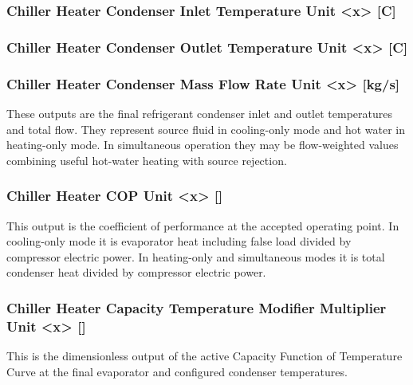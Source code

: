 \subsubsection{Chiller Heater Condenser Inlet Temperature Unit \textless{}x\textgreater{} {[}C{]}}\label{chiller-heater-condenser-inlet-temperature-unit-x-c}

\subsubsection{Chiller Heater Condenser Outlet Temperature Unit \textless{}x\textgreater{} {[}C{]}}\label{chiller-heater-condenser-outlet-temperature-unit-x-c}

\subsubsection{Chiller Heater Condenser Mass Flow Rate Unit \textless{}x\textgreater{} {[}kg/s{]}}\label{chiller-heater-condenser-mass-flow-rate-unit-x-kgs}

These outputs are the final refrigerant condenser inlet and outlet temperatures and total flow. They represent source fluid in cooling-only mode and hot water in heating-only mode. In simultaneous operation they may be flow-weighted values combining useful hot-water heating with source rejection.

\subsubsection{Chiller Heater COP Unit \textless{}x\textgreater{} {[]}}\label{chiller-heater-cop-unit-x}

This output is the coefficient of performance at the accepted operating point. In cooling-only mode it is evaporator heat including false load divided by compressor electric power. In heating-only and simultaneous modes it is total condenser heat divided by compressor electric power.

\subsubsection{Chiller Heater Capacity Temperature Modifier Multiplier Unit \textless{}x\textgreater{} {[]}}\label{chiller-heater-capacity-temperature-modifier-multiplier-unit-x}

This is the dimensionless output of the active Capacity Function of Temperature Curve at the final evaporator and configured condenser temperatures.

